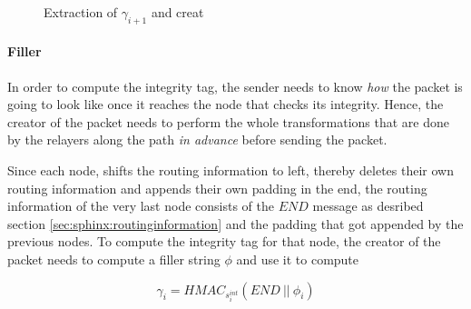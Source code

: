 \begin{figure}[H]
    \caption{Extraction of $\gamma_{i+1}$ and creat}
\end{figure}

\paragraph{Filler}

In order to compute the integrity tag, the sender needs to know \textit{how} the packet is going to look like once it reaches the node that checks its integrity. Hence, the creator of the packet needs to perform the whole transformations that are done by the relayers along the path \textit{in advance} before sending the packet.

Since each node, shifts the routing information to left, thereby deletes their own routing information and appends their own padding in the end, the routing information of the very last node consists of the $END$ message as desribed section \ref{sec:sphinx:routinginformation} and the padding that got appended by the previous nodes. To compute the integrity tag for that node, the creator of the packet needs to compute a filler string $\phi$ and use it to compute

$$\gamma_i = HMAC_{s_i^{int}}(END \ || \ \phi_i )$$

